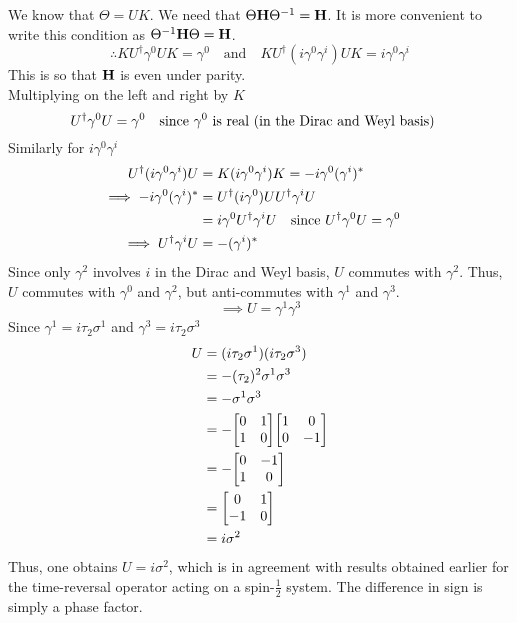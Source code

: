 \documentclass[12pt,a4paper,titlepage]{article}
\newcommand{\trm}[1]{\textrm{#1}} %
\begin{document}
We know that $\Theta=UK$. We need that $\Theta\vb{H}\Theta^{-1}=\vb{H}$. It is more convenient to write this condition as $\Theta^{-1}\vb{H}\Theta=\vb{H}$.
\begin{equation}
\therefore KU^{\dagger}\gamma^{0}UK=\gamma^{0} \quad\trm{and}\quad KU^{\dagger}(i\gamma^{0}\gamma^{i})UK=i\gamma^{0}\gamma^{i}
\end{equation}
This is so that $\vb{H}$ is even under parity.\\

Multiplying on the left and right by $K$
\begin{equation}
U^{\dagger}\gamma^{0}U=\gamma^{0}\qq{since $\gamma^{0}$ is real (in the Dirac and Weyl basis)}
\end{equation}
Similarly for $i\gamma^{0}\gamma^{i}$
\begin{equation}
\begin{aligned}
U^{\dagger}(i\gamma^{0}\gamma^{i})U&=K(i\gamma^{0}\gamma^{i})K=-i\gamma^{0}(\gamma^{i})^{*}\\
\implies -i\gamma^{0}(\gamma^{i})^{*}&=U^{\dagger}(i\gamma^{0})UU^{\dagger}\gamma^{i}U\\
&=i\gamma^{0}U^{\dagger}\gamma^{i}U\qq{since $U^{\dagger}\gamma^{0}U=\gamma^{0}$}\\
\implies U^{\dagger}\gamma^{i}U&=-(\gamma^{i})^{*}
\end{aligned}
\end{equation}
Since only $\gamma^{2}$ involves $i$ in the Dirac and Weyl basis, $U$ commutes with $\gamma^{2}$. Thus, $U$ commutes with $\gamma^{0}$ and $\gamma^{2}$, but anti-commutes with $\gamma^{1}$ and $\gamma^{3}$.
\begin{equation}
\implies U=\gamma^{1}\gamma^{3}
\end{equation}
Since $\gamma^{1}=i\tau_{2}\sigma^{1}$ and $\gamma^{3}=i\tau_{2}\sigma^{3}$
\begin{equation}
\begin{aligned}
U&=(i\tau_{2}\sigma^{1})(i\tau_{2}\sigma^{3})\\
&=-(\tau_{2})^{2}\sigma^{1}\sigma^{3}\\
&=-\sigma^{1}\sigma^{3}\\
&=-\mqty[0 & 1 \\ 1 & 0]\mqty[1 & 0 \\ 0 & -1]\\
&=-\mqty[0 & -1 \\ 1 & 0]\\
&=\mqty[0 & 1 \\ -1 & 0]\\
&=i\sigma^{2}
\end{aligned}
\end{equation}
Thus, one obtains $U=i\sigma^{2}$, which is in agreement with results obtained earlier for the time-reversal operator acting on a spin-$\frac{1}{2}$ system. The difference in sign is simply a phase factor.\\
\end{document}
